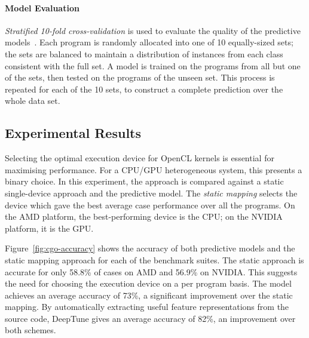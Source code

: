 \paragraph*{Model Evaluation}

\emph{Stratified 10-fold cross-validation} is used to evaluate the quality of the predictive models~\cite{Han2011}. Each program is randomly allocated into one of 10 equally-sized sets; the sets are balanced to maintain a distribution of instances from each class consistent with the full set. A model is trained on the programs from all but one of the sets, then tested on the programs of the unseen set. This process is repeated for each of the 10 sets, to construct a complete prediction over the whole data set.




\subsection{Experimental Results}

Selecting the optimal execution device for OpenCL kernels is essential for maximising performance. For a CPU/GPU heterogeneous system, this presents a binary choice. In this experiment, the approach is compared against a static single-device approach and the \citeauthor{Grewe2013} predictive model. The \emph{static mapping} selects the device which gave the best average case performance over all the programs. On the AMD platform, the best-performing device is the CPU; on the NVIDIA platform, it is the GPU.

Figure~\ref{fig:cgo-accuracy} shows the accuracy of both predictive models and the static mapping approach for each of the benchmark suites. The static approach is accurate for only 58.8\% of cases on AMD and 56.9\% on NVIDIA. This suggests the need for choosing the execution device on a per program basis. The \citeauthor{Grewe2013} model achieves an average accuracy of 73\%, a significant improvement over the static mapping. By automatically extracting useful feature representations from the source code, DeepTune gives an average accuracy of 82\%, an improvement over both schemes.

